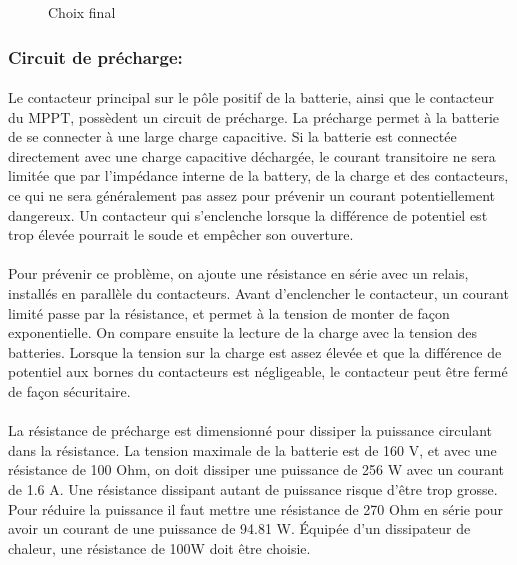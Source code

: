 		\begin{figure}[H]
			\centering
			\caption[Choix final]{Choix final}
			\label{fig:contactorsolfinal}
		\end{figure}
		


	\subsubsection*{Circuit de précharge:}
		\paragraph*{}
		Le contacteur principal sur le pôle positif de la batterie, ainsi que le contacteur du MPPT, possèdent un circuit de précharge. La précharge permet à la batterie de se connecter à une large charge capacitive. Si la batterie est connectée directement avec une charge capacitive déchargée, le courant transitoire ne sera limitée que par l'impédance interne de la battery, de la charge et des contacteurs, ce qui ne sera généralement pas assez pour prévenir un courant potentiellement dangereux. Un contacteur qui s'enclenche lorsque la différence de potentiel est trop élevée pourrait le soude et empêcher son ouverture.
		
		\paragraph*{}
		Pour prévenir ce problème, on ajoute une résistance en série avec un relais, installés en parallèle du contacteurs. Avant d'enclencher le contacteur, un courant limité passe par la résistance, et permet à la tension de monter de façon exponentielle. On compare ensuite la lecture de la charge avec la tension des batteries. Lorsque la tension sur la charge est assez élevée et que la différence de potentiel aux bornes du contacteurs est négligeable, le contacteur peut être fermé de façon sécuritaire.
		

		
		\paragraph*{}		
		La résistance de précharge est dimensionné pour dissiper la puissance circulant dans la résistance. La tension maximale de la batterie est de 160 V, et avec une résistance de 100 Ohm, on doit dissiper une puissance de 256 W avec un courant de 1.6 A. Une résistance dissipant autant de puissance risque d'être trop grosse. Pour réduire la puissance il faut mettre une résistance de 270 Ohm en série pour avoir un courant de une puissance de 94.81 W. Équipée d'un dissipateur de chaleur, une résistance de 100W doit être choisie.
		
